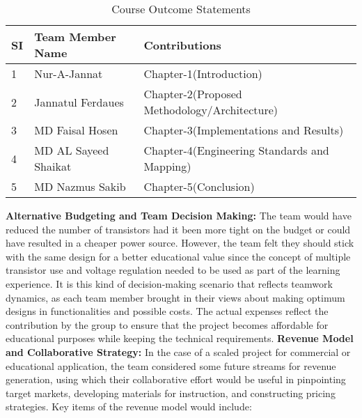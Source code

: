 \begin{table}[h!]
\centering
\caption{Course Outcome Statements}
\vspace{0.1cm} %
\begin{tabular}{|p{}|p{}|p{}|}
\hline
\textbf{SI} & \textbf{Team Member Name} & \textbf{Contributions} \\
\hline
1 & Nur-A-Jannat & Chapter-1(Introduction) \\
\hline
2 & Jannatul Ferdaues & Chapter-2(Proposed Methodology/Architecture) \\
\hline
3 & MD Faisal Hosen & Chapter-3(Implementations and Results)\\
\hline
4 & MD AL Sayeed Shaikat & Chapter-4(Engineering Standards and Mapping)\\
\hline
5 & MD Nazmus Sakib & Chapter-5(Conclusion)\\
\hline
\end{tabular}
\end{table}

\noindent\textbf{Alternative Budgeting and Team Decision Making:}
The team would have reduced the number of transistors had it been more tight on the budget or could have resulted in a cheaper power source. However, the team felt they should stick with the same design for a better educational value since the concept of multiple transistor use and voltage regulation needed to be used as part of the learning experience. It is this kind of decision-making scenario that reflects teamwork dynamics, as each team member brought in their views about making optimum designs in functionalities and possible costs. The actual expenses reflect the contribution by the group to ensure that the project becomes affordable for educational purposes while keeping the technical requirements.
\vspace{.5 cm}
\newline\textbf{Revenue Model and Collaborative Strategy:}
In the case of a scaled project for commercial or educational application, the team considered some future streams for revenue generation, using which their collaborative effort would be useful in pinpointing target markets, developing materials for instruction, and constructing pricing strategies. Key items of the revenue model would include:
\vspace{.5 cm}








